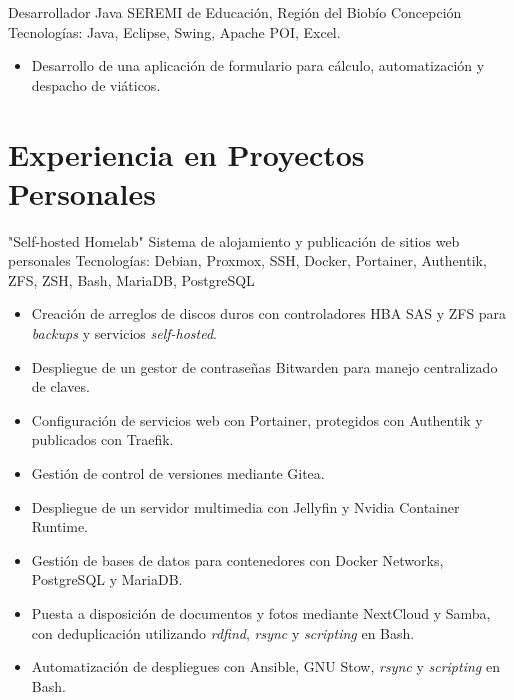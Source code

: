 \documentclass[12pt,letterpaper,sans]{moderncv}
\begin{document}
{Desarrollador Java}
{SEREMI de Educación, Región del Biobío}
{\newline Concepción}
{\newline Tecnologías: Java, Eclipse, Swing, Apache POI, Excel.}
{
  \begin{itemize}
    \item Desarrollo de una aplicación de formulario para cálculo, automatización y despacho de viáticos.
  \end{itemize}
}
\vspace{0.5em}

\newpage

\section{Experiencia en Proyectos Personales}

\cventry{}
{"Self-hosted Homelab"}
{Sistema de alojamiento y publicación de sitios web personales}
{\newline Tecnologías: Debian, Proxmox, SSH, Docker, Portainer, Authentik, ZFS, ZSH, Bash, MariaDB, PostgreSQL}
{\newline}
{
  \begin{itemize}
    \item Creación de arreglos de discos duros con controladores HBA SAS y ZFS para \textit{backups} y servicios \textit{self-hosted}.
    \item Despliegue de un gestor de contraseñas Bitwarden para manejo centralizado de claves.
    \item Configuración de servicios web con Portainer, protegidos con Authentik y publicados con Traefik.
    \item Gestión de control de versiones mediante Gitea.
    \item Despliegue de un servidor multimedia con Jellyfin y Nvidia Container Runtime.
    \item Gestión de bases de datos para contenedores con Docker Networks, PostgreSQL y MariaDB.
    \item Puesta a disposición de documentos y fotos mediante NextCloud y Samba, con deduplicación utilizando \textit{rdfind}, \textit{rsync} y \textit{scripting} en Bash.
    \item Automatización de despliegues con Ansible, GNU Stow, \textit{rsync} y \textit{scripting} en Bash.
  \end{itemize}
}
\vspace{0.5em}
\end{document}
